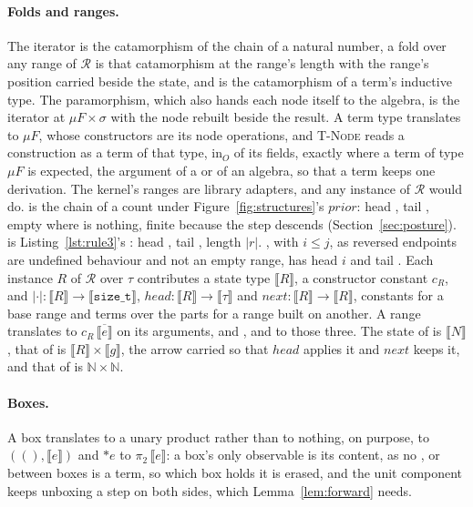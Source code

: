 \paragraph{Folds and ranges.}
The iterator is the catamorphism of the chain of a natural number, a fold over any range of $\mathcal{R}$ is that catamorphism at the range's length with the range's position carried beside the state, and  is the catamorphism of a term's inductive type.
The paramorphism, which also hands each node itself to the algebra, is the iterator at $\mu F \times \sigma$ with the node rebuilt beside the result.
A term type translates to $\mu F$, whose constructors are its node operations, and \textsc{T-Node} reads a construction as a term of that type, $\mathrm{in}_O$ of its fields, exactly where a term of type $\mu F$ is expected, the argument of a  or of an algebra, so that a term keeps one derivation.
The kernel's ranges are library adapters, and any instance of $\mathcal{R}$ would do.
 is the chain of a count under Figure~\ref{fig:structures}'s $\mathit{prior}$: head , tail , empty where  is nothing, finite because the step descends (Section~\ref{sec:posture}).
 is Listing~\ref{lst:rule3}'s : head , tail , length $|r|$.
, with $i \le j$, as reversed endpoints are undefined behaviour and not an empty range, has head $i$ and tail .
Each instance $R$ of $\mathcal{R}$ over $\tau$ contributes a state type $\llbracket R \rrbracket$, a constructor constant $c_R$, and $|\cdot| : \llbracket R \rrbracket \to \llbracket \texttt{size\_t} \rrbracket$, $\mathit{head} : \llbracket R \rrbracket \to \llbracket \tau \rrbracket$ and $\mathit{next} : \llbracket R \rrbracket \to \llbracket R \rrbracket$, constants for a base range and terms over the parts for a range built on another.
A range translates to $c_R\,\overline{\llbracket e \rrbracket}$ on its arguments, and ,  and  to those three.
The state of  is $\llbracket N \rrbracket$, that of  is $\llbracket R \rrbracket \times \llbracket g \rrbracket$, the arrow carried so that $\mathit{head}$ applies it and $\mathit{next}$ keeps it, and that of  is $\mathbb{N} \times \mathbb{N}$.

\paragraph{Boxes.}
A box translates to a unary product rather than to nothing, on purpose,  to $((), \llbracket e \rrbracket)$ and $\texttt{*}e$ to $\pi_2\,\llbracket e \rrbracket$: a box's only observable is its content, as no ,  or \cppinline{==} between boxes is a term, so which box holds it is erased, and the unit component keeps unboxing a step on both sides, which Lemma~\ref{lem:forward} needs.

